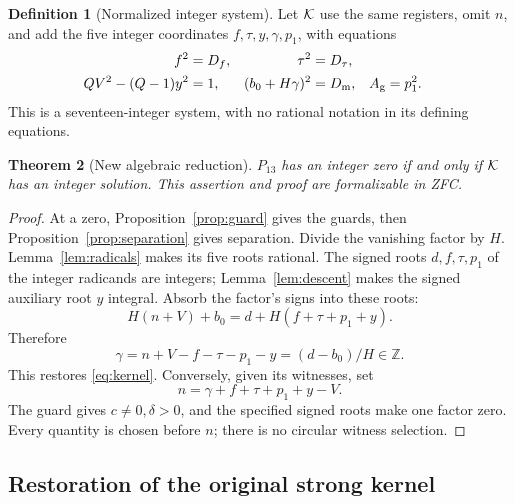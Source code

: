 \documentclass[11pt,a4paper]{article}
\newtheorem{theorem}{Theorem}[section]
\theoremstyle{definition}\newtheorem{definition}[theorem]{Definition}
\theoremstyle{remark}\newtheorem{remark}[theorem]{Remark}
\newcommand{\Z}{\mathbb Z}\newcommand{\Q}{\mathbb Q}\newcommand{\N}{\mathbb N}
\newcommand{\Dm}{D_{\rm m}}\newcommand{\Dt}{D_{\tau}}
\newcommand{\Df}{D_f}\newcommand{\Dy}{D_y}\newcommand{\Ag}{A_{\rm g}}
\numberwithin{equation}{section}
\begin{document}
\begin{definition}[Normalized integer system]\label{def:kernel}
Let \(\mathcal K\) use the same registers, omit \(n\), and add the five
integer coordinates \(f,\tau,y,\gamma,p_1\), with equations
\begin{align}
f^2&=\Df,&\tau^2&=\Dt,\nonumber\\
QV^2-(Q-1)y^2&=1,&
(b_0+H\gamma)^2&=\Dm,&\Ag&=p_1^2.
\label{eq:kernel}
\end{align}
This is a seventeen-integer system, with no rational notation in
its defining equations.
\end{definition}

\begin{theorem}[New algebraic reduction]\label{thm:algebra}
\(P_{13}\) has an integer zero if and only if \(\mathcal K\) has an
integer solution. This assertion and proof are formalizable in ZFC.
\end{theorem}
\begin{proof}
At a zero, Proposition~\ref{prop:guard} gives the guards, then
Proposition~\ref{prop:separation} gives separation.
Divide the vanishing factor by \(H\). Lemma~\ref{lem:radicals}
makes its five roots rational.
The signed roots \(d,f,\tau,p_1\) of the integer radicands are
integers; Lemma~\ref{lem:descent} makes the signed auxiliary root
\(y\) integral. Absorb the factor's signs into these roots:
\[
H(n+V)+b_0=d+H(f+\tau+p_1+y).
\]
Therefore
\begin{equation}
\gamma=n+V-f-\tau-p_1-y=(d-b_0)/H\in\Z.
\label{eq:gamma}
\end{equation}
This restores \eqref{eq:kernel}.
Conversely, given its witnesses, set
\begin{equation}
n=\gamma+f+\tau+p_1+y-V.
\label{eq:choose-n}
\end{equation}
The guard gives \(c\ne0,\delta>0\), and the specified signed roots
make one factor zero. Every quantity is chosen before \(n\);
there is no circular witness selection.
\end{proof}

\subsection{Restoration of the original strong kernel}
\end{document}
